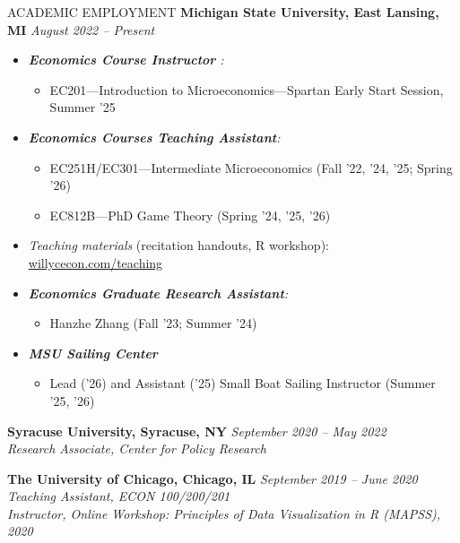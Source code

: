 \documentclass{resume} %
\begin{document}
\begin{rSection}{ACADEMIC EMPLOYMENT}
{\bf Michigan State University, East Lansing, MI } \hfill {\em August 2022 – Present}
\begin{itemize}
\item \textit{\textbf{Economics Course Instructor} :}
\begin{itemize}
    \item EC201---Introduction to Microeconomics---Spartan Early Start Session, Summer '25
\end{itemize}
\item  {\textit{\textbf{Economics Courses Teaching Assistant}:}}
\begin{itemize}
    \item EC251H/EC301---Intermediate Microeconomics (Fall '22, '24, '25; Spring '26)
    \item EC812B---PhD Game Theory (Spring '24, '25, '26)
\end{itemize}
\item \textit{Teaching materials} (recitation handouts, R workshop): \href{https://willycecon.com/teaching/}{willycecon.com/teaching}

\item {\textit{\textbf{Economics Graduate Research Assistant}:}}
\begin{itemize}
    \item Hanzhe Zhang (Fall '23; Summer '24)
\end{itemize}
\item \textbf{\textit{MSU Sailing Center}}
\begin{itemize}
    \item Lead ('26) and Assistant ('25) Small Boat Sailing Instructor (Summer '25, '26)
\end{itemize}
\end{itemize}


\item {\bf Syracuse University, Syracuse, NY } \hfill {\em September 2020 – May 2022}\\
{\textit{Research Associate, Center for Policy Research}}

\item {\bf The University of Chicago, Chicago, IL } \hfill {\em September 2019 – June 2020}\\
{\textit{Teaching Assistant, ECON 100/200/201}}\\
{\textit{Instructor, Online Workshop: Principles of Data Visualization in R (MAPSS), 2020}}

\end{rSection}
\end{document}
